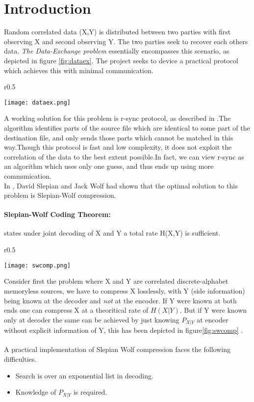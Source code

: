 \documentclass[
11pt, %
a4paper, %
oneside, %
headinclude,footinclude, %
BCOR5mm, %
]{scrartcl}
\begin{document}
\section{Introduction}
Random correlated data (X,Y) is distributed between two parties with first observing X and second observing Y. The two parties seek to recover each others data. \emph{The Data-Exchange problem} essentially encompasses this scenario, as depicted in figure \ref{fig:dataex}. The project seeks to device a practical protocol which achieves this with minimal communication.\\
\begin{wrapfigure}{r}{0.5\textwidth}
  \begin{center}
    \texttt{[image: dataex.png]}
  \end{center}
  \caption{The Data-Exchange Problem}
  \label{fig:dataex}
\end{wrapfigure}
A working solution for this problem is r-sync protocol, as described in   \cite{rsync}.The algorithm identifies parts of the source file which are identical to some part of the destination file, and only sends those parts which cannot be matched in this way.Though this protocol is fast and low complexity, it does not exploit the correlation of the data to the best extent possible.In fact, we can view r-sync as an algorithm which uses only one guess, and thus ends up using more communication.\\
In \cite{sw}, David Slepian and Jack Wolf had shown that the optimal solution to this problem is Slepian-Wolf compression. 
\paragraph{Slepian-Wolf Coding Theorem:}states under joint decoding of X and Y a total rate H(X,Y) is sufficient.\\
\begin{wrapfigure}{r}{0.5\textwidth}
  \begin{center}
    \texttt{[image: swcomp.png]}
  \end{center}
  \caption{The Slepian-Wolf Compression}
  \label{fig:swcomp}
\end{wrapfigure}
Consider first the problem where X and Y are correlated discrete-alphabet memoryless sources, we have to compress X losslessly, with Y (side information) being known at the decoder and \emph{not} at the encoder. If Y were known at both ends one can compress X at a theoritical rate of $H(X|Y)$. But if Y were known only at decoder the same can be achieved by just knowing $P_{X|Y}$ at encoder without explicit information of Y, this has been depicted in figure\ref{fig:swcomp} \cite{discus}. 
\\\\
A practical implementation of Slepian Wolf compression faces the following difficulties.
\begin{itemize}
\item Search is over an exponential list in decoding.
\item Knowledge of $P_{X|Y}$ is required.
\end{itemize} 
\end{document}
